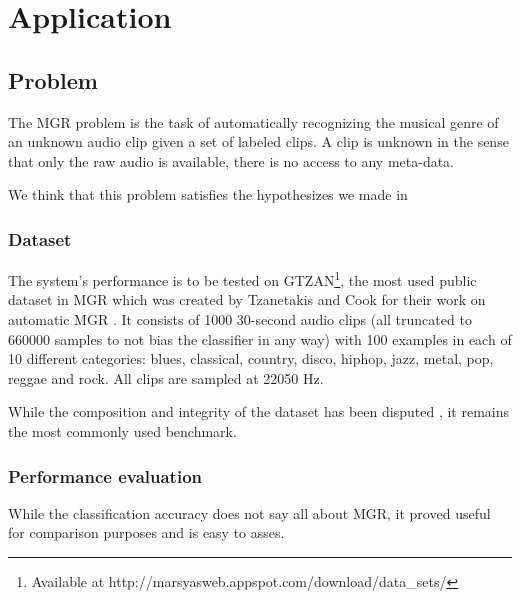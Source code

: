 \part{Application} \label{part:application}

\chapter{Problem} \label{chap:problem}

The \gls{MGR} problem is the task of automatically recognizing the musical genre of an unknown audio clip given a set of labeled clips. A clip is unknown in the sense that only the raw audio is available, there is no access to any meta-data.

We think that this problem satisfies the hypothesizes we made in 

\section{Dataset}

The system's performance is to be tested on GTZAN\footnote{Available at http://marsyasweb.appspot.com/download/data\_sets/}, the most used public dataset in \gls{MGR} \cite{sturm2014survey} which was created by Tzanetakis and Cook for their work on automatic \gls{MGR} \cite{tzanetakis2002GTZAN}. It consists of 1000 30-second audio clips (all truncated to $660000$ samples to not bias the classifier in any way) with 100 examples in each of 10 different categories: blues, classical, country, disco, hiphop, jazz, metal, pop, reggae and rock. All clips are sampled at 22050 Hz.

While the composition and integrity of the dataset has been disputed \cite{sturm2012GTZANanalysis}, it remains the most commonly used benchmark.

\section{Performance evaluation}

While the classification accuracy does not say all about \gls{MGR}, it proved useful for comparison purposes and is easy to asses.


